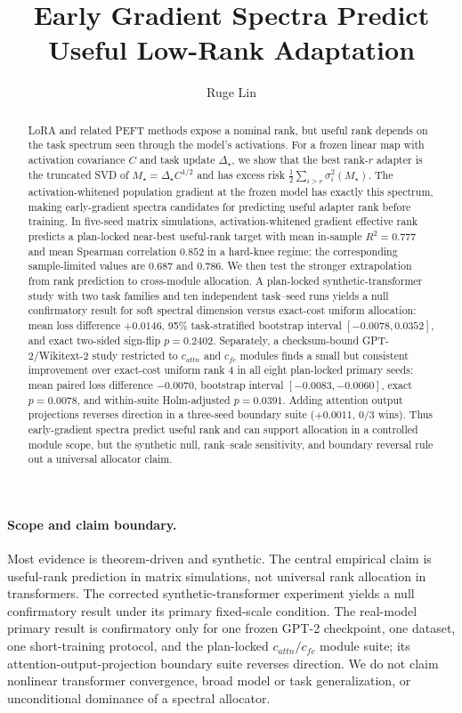 \documentclass[10pt,twocolumn]{article}
\title{Early Gradient Spectra Predict Useful Low-Rank Adaptation}
\author{Ruge Lin}
\date{}
\theoremstyle{definition}
\begin{document}
\maketitle



\begin{abstract}
LoRA and related PEFT methods expose a nominal rank, but useful rank depends on the task spectrum seen through the model's activations.  For a frozen linear map with activation covariance $C$ and task update $\Delta_\star$, we show that the best rank-$r$ adapter is the truncated SVD of $M_\star=\Delta_\star C^{1/2}$ and has excess risk $\frac12\sum_{i>r}\sigma_i^2(M_\star)$.  The activation-whitened population gradient at the frozen model has exactly this spectrum, making early-gradient spectra candidates for predicting useful adapter rank before training.  In five-seed matrix simulations, activation-whitened gradient effective rank predicts a plan-locked near-best useful-rank target with mean in-sample $R^2=0.777$ and mean Spearman correlation $0.852$ in a hard-knee regime; the corresponding sample-limited values are $0.687$ and $0.786$.  We then test the stronger extrapolation from rank prediction to cross-module allocation.  A plan-locked synthetic-transformer study with two task families and ten independent task--seed runs yields a null confirmatory result for soft spectral dimension versus exact-cost uniform allocation: mean loss difference $+0.0146$, 95\% task-stratified bootstrap interval $[-0.0078,0.0352]$, and exact two-sided sign-flip $p=0.2402$.  Separately, a checksum-bound GPT-2/Wikitext-2 study restricted to $c_{attn}$ and $c_{fc}$ modules finds a small but consistent improvement over exact-cost uniform rank 4 in all eight plan-locked primary seeds: mean paired loss difference $-0.0070$, bootstrap interval $[-0.0083,-0.0060]$, exact $p=0.0078$, and within-suite Holm-adjusted $p=0.0391$.  Adding attention output projections reverses direction in a three-seed boundary suite ($+0.0011$, 0/3 wins).  Thus early-gradient spectra predict useful rank and can support allocation in a controlled module scope, but the synthetic null, rank--scale sensitivity, and boundary reversal rule out a universal allocator claim.
\end{abstract}

\paragraph{Scope and claim boundary.}
Most evidence is theorem-driven and synthetic.  The central empirical claim is useful-rank prediction in matrix simulations, not universal rank allocation in transformers.  The corrected synthetic-transformer experiment yields a null confirmatory result under its primary fixed-scale condition.  The real-model primary result is confirmatory only for one frozen GPT-2 checkpoint, one dataset, one short-training protocol, and the plan-locked $c_{attn}/c_{fc}$ module suite; its attention-output-projection boundary suite reverses direction.  We do not claim nonlinear transformer convergence, broad model or task generalization, or unconditional dominance of a spectral allocator.
\end{document}
